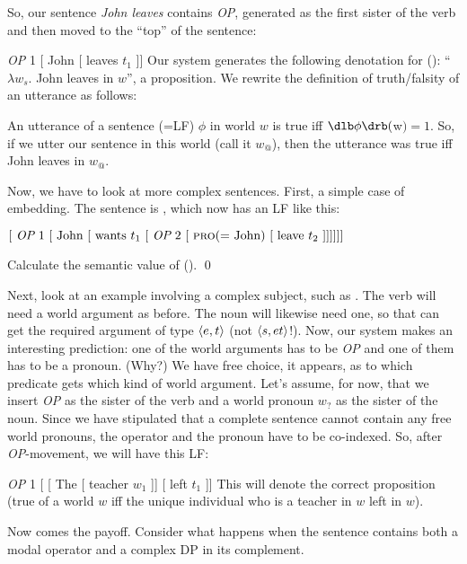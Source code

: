 So, our sentence \emph{John leaves} contains \emph{OP}, generated as the first
sister of the verb and then moved to the ``top'' of the sentence:

\ex \emph{OP} 1 [ John [ leaves $t_1$ ]] \xe
%
Our system generates the following denotation for (\lastx): ``$\lambda w_s.$
John leaves in $w$'', a proposition. We rewrite the definition of truth/falsity
of an utterance as follows:

\ex An utterance of a sentence (=LF) $\phi$ in world $w$ is true iff
$\sv{\phi}($w$) = 1$. \xe
%
So, if we utter our sentence in this world (call it $w_@$), then the utterance
was true iff John leaves in $w_@$.

Now, we have to look at more complex sentences. First, a simple case of
embedding. The sentence is , which now has an LF
like this:

\ex $[\ \emph{OP}\ 1\ [ \mbox{ John } [ \mbox{ wants } t_{1}\ [\ \emph{OP}\ 2\ [
\mbox{ \textsc{pro}(= John) } [ \mbox{ leave } t_{2}\ ]]]]]]$ \xe
 
\begin{exercise}
	Calculate the semantic value of (\lastx). \qed
\end{exercise}

Next, look at an example involving a complex subject, such as . The verb will need a world argument as before. The noun
 will likewise need one, so that  can get
the required argument of type $\langle e,t \rangle$ (not $\langle s,et \rangle$!). Now, our
system makes an interesting prediction: one of the world arguments has to be
\emph{OP} and one of them has to be a pronoun. (Why?) We have free choice, it
appears, as to which predicate gets which kind of world argument. Let's assume,
for now, that we insert \emph{OP} as the sister of the verb and a world pronoun
$w_?$ as the sister of the noun. Since we have stipulated that a complete
sentence cannot contain any free world pronouns, the operator and the pronoun
have to be co-indexed. So, after \emph{OP}-movement, we will have this LF:

\ex \emph{OP} 1 [ [ The [ teacher $w_1$ ]] [ left $t_1$ ]] \xe
%
This will denote the correct proposition (true of a world $w$ iff the unique
individual who is a teacher in $w$ left in $w$).

Now comes the payoff. Consider what happens when the sentence contains both a
modal operator and a complex DP in its complement.

